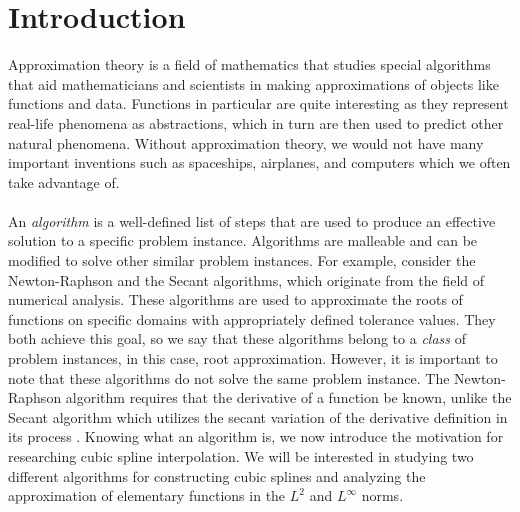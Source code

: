 

\chapter{Introduction}
\label{chapter1}
\thispagestyle{empty}

 Approximation theory is a field of mathematics that studies special algorithms that aid mathematicians and scientists in making approximations of objects like functions and data. Functions in particular are quite interesting as they represent real-life phenomena as abstractions, which in turn are then used to predict other natural phenomena. Without approximation theory, we would not have many important inventions such as spaceships, airplanes, and computers which we often take advantage of.
\\\\
An \emph{algorithm} is a well-defined list of steps that are used to produce an effective solution to a specific problem instance. Algorithms are malleable and can be modified to solve other similar problem instances. For example, consider the Newton-Raphson and the Secant algorithms, which originate from the field of numerical analysis. These algorithms are used to approximate the roots of functions on specific domains with appropriately defined tolerance values. They both achieve this goal, so we say that these algorithms belong to a \emph{class} of problem instances, in this case, root approximation. However, it is important to note that these algorithms do not solve the same problem instance. The Newton-Raphson algorithm requires that the derivative of a function be known, unlike the Secant algorithm which utilizes the secant variation of the derivative definition in its process \cite{key3}. Knowing what an algorithm is, we now introduce the motivation for researching cubic spline interpolation. We will be interested in studying two different algorithms for constructing cubic splines and analyzing the approximation of elementary functions in the $L^2$ and $L^{\infty}$ norms.


